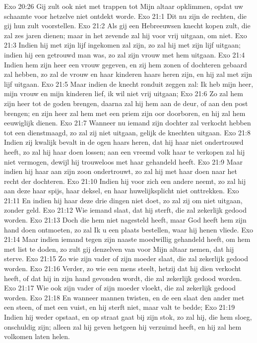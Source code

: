 Exo 20:26  Gij zult ook niet met trappen tot Mijn altaar opklimmen, opdat uw schaamte voor hetzelve niet ontdekt worde.
Exo 21:1  Dit nu zijn de rechten, die gij hun zult voorstellen.
Exo 21:2  Als gij een Hebreeuwsen knecht kopen zult, die zal zes jaren dienen; maar in het zevende zal hij voor vrij uitgaan, om niet.
Exo 21:3  Indien hij met zijn lijf ingekomen zal zijn, zo zal hij met zijn lijf uitgaan; indien hij een getrouwd man was, zo zal zijn vrouw met hem uitgaan.
Exo 21:4  Indien hem zijn heer een vrouw gegeven, en zij hem zonen of dochteren gebaard zal hebben, zo zal de vrouw en haar kinderen haars heren zijn, en hij zal met zijn lijf uitgaan.
Exo 21:5  Maar indien de knecht ronduit zeggen zal: Ik heb mijn heer, mijn vrouw en mijn kinderen lief, ik wil niet vrij uitgaan;
Exo 21:6  Zo zal hem zijn heer tot de goden brengen, daarna zal hij hem aan de deur, of aan den post brengen; en zijn heer zal hem met een priem zijn oor doorboren, en hij zal hem eeuwiglijk dienen.
Exo 21:7  Wanneer nu iemand zijn dochter zal verkocht hebben tot een dienstmaagd, zo zal zij niet uitgaan, gelijk de knechten uitgaan.
Exo 21:8  Indien zij kwalijk bevalt in de ogen haars heren, dat hij haar niet ondertrouwd heeft, zo zal hij haar doen lossen; aan een vreemd volk haar te verkopen zal hij niet vermogen, dewijl hij trouweloos met haar gehandeld heeft.
Exo 21:9  Maar indien hij haar aan zijn zoon ondertrouwt, zo zal hij met haar doen naar het recht der dochteren.
Exo 21:10  Indien hij voor zich een andere neemt, zo zal hij aan deze haar spijs, haar deksel, en haar huwelijksplicht niet onttrekken.
Exo 21:11  En indien hij haar deze drie dingen niet doet, zo zal zij om niet uitgaan, zonder geld.
Exo 21:12  Wie iemand slaat, dat hij sterft, die zal zekerlijk gedood worden.
Exo 21:13  Doch die hem niet nagesteld heeft, maar God heeft hem zijn hand doen ontmoeten, zo zal Ik u een plaats bestellen, waar hij henen vliede.
Exo 21:14  Maar indien iemand tegen zijn naaste moedwillig gehandeld heeft, om hem met list te doden, zo zult gij denzelven van voor Mijn altaar nemen, dat hij sterve.
Exo 21:15  Zo wie zijn vader of zijn moeder slaat, die zal zekerlijk gedood worden.
Exo 21:16  Verder, zo wie een mens steelt, hetzij dat hij dien verkocht heeft, of dat hij in zijn hand gevonden wordt, die zal zekerlijk gedood worden.
Exo 21:17  Wie ook zijn vader of zijn moeder vloekt, die zal zekerlijk gedood worden.
Exo 21:18  En wanneer mannen twisten, en de een slaat den ander met een steen, of met een vuist, en hij sterft niet, maar valt te bedde;
Exo 21:19  Indien hij weder opstaat, en op straat gaat bij zijn stok, zo zal hij, die hem sloeg, onschuldig zijn; alleen zal hij geven hetgeen hij verzuimd heeft, en hij zal hem volkomen laten helen.
